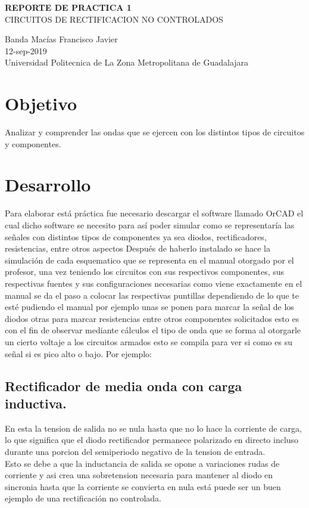 \usepackage{graphicx}
\usepackage{amsmath}
\usepackage{amssymb}
\usepackage{mathrsfs}
\usepackage{cancel}


\begin{center}
\textbf{REPORTE DE PRACTICA 1}\\
CIRCUITOS DE RECTIFICACION NO CONTROLADOS
\end{center}

\begin{center}
Banda Macías Francisco Javier\\
12-sep-2019\\
Universidad Politecnica de La Zona Metropolitana de Guadalajara
\end{center}

\section{Objetivo}
Analizar y comprender las ondas que se ejercen con los distintos tipos de circuitos y componentes.

\section{Desarrollo}
Para elaborar está práctica fue necesario descargar el software llamado OrCAD el cual dicho software se necesito para así poder simular como se representaría las señales con distintos tipos de componentes ya sea diodos, rectificadores, resistencias, entre otros aspectos
Después de haberlo instalado se hace la simulación de cada esquematico que se representa en el manual otorgado por el profesor, una vez teniendo los circuitos con sus respectivos componentes, sus respectivas fuentes y sus configuraciones necesarias como viene exactamente en el manual se da el paso a colocar las respectivas puntillas dependiendo de lo que te esté pudiendo el manual por ejemplo unas se ponen para marcar la señal de  los diodos otras para marcar resistencias entre otros componentes solicitados esto es con el fin de observar mediante cálculos el tipo de onda que se forma al otorgarle un cierto voltaje a los circuitos armados esto se compila para ver si como es su señal si es pico alto o bajo.
Por ejemplo:
\subsection{Rectificador de media onda con carga inductiva.}
En esta la tension de salida no se nula hasta que no lo hace la corriente de carga, lo que significa que el diodo rectificador permanece polarizado en directo incluso durante una porcion del semiperiodo negativo de la tension de entrada.\\
\newpage Esto se debe a que la inductancia de salida se opone a variaciones rudas de corriente y asi crea una sobretension necesaria para mantener al diodo en sincronia hasta que la corriente se convierta en nula está puede ser un buen ejemplo de una rectificación no controlada.
